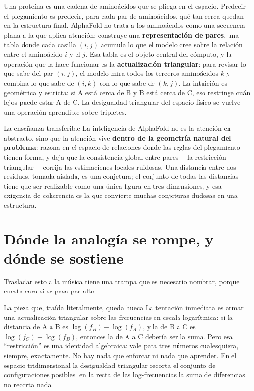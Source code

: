 \documentclass[11pt]{article}
\begin{document}
Una proteína es una cadena de aminoácidos que se pliega en el espacio. Predecir el plegamiento es predecir, para cada par de aminoácidos, qué tan cerca quedan en la estructura final. AlphaFold no trata a los aminoácidos como una secuencia plana a la que aplica atención: construye una \textbf{representación de pares}, una tabla donde cada casilla $(i,j)$ acumula lo que el modelo cree sobre la relación entre el aminoácido $i$ y el $j$. Esa tabla es el objeto central del cómputo, y la operación que la hace funcionar es la \textbf{actualización triangular}: para revisar lo que sabe del par $(i,j)$, el modelo mira todos los terceros aminoácidos $k$ y combina lo que sabe de $(i,k)$ con lo que sabe de $(k,j)$. La intuición es geométrica y estricta: si A está cerca de B y B está cerca de C, eso restringe cuán lejos puede estar A de C. La desigualdad triangular del espacio físico se vuelve una operación aprendible sobre tripletes.

\begin{keybox}{La enseñanza transferible}
La inteligencia de AlphaFold no es la atención en abstracto, sino que la atención vive \textbf{dentro de la geometría natural del problema}: razona en el espacio de relaciones donde las reglas del plegamiento tienen forma, y deja que la consistencia global entre pares —la restricción triangular— corrija las estimaciones locales ruidosas. Una distancia entre dos residuos, tomada aislada, es una conjetura; el conjunto de todas las distancias tiene que ser realizable como una única figura en tres dimensiones, y esa exigencia de coherencia es la que convierte muchas conjeturas dudosas en una estructura.
\end{keybox}

\section{Dónde la analogía se rompe, y dónde se sostiene}

Trasladar esto a la música tiene una trampa que es necesario nombrar, porque cuesta cara si se pasa por alto.

\begin{alertbox}{La pieza que, traída literalmente, queda hueca}
La tentación inmediata es armar una actualización triangular sobre las frecuencias en escala logarítmica: si la distancia de A a B es $\log(f_B) - \log(f_A)$, y la de B a C es $\log(f_C) - \log(f_B)$, entonces la de A a C debería ser la suma. Pero esa ``restricción'' es una identidad algebraica: vale para tres números cualesquiera, siempre, exactamente. No hay nada que enforcar ni nada que aprender. En el espacio tridimensional la desigualdad triangular recorta el conjunto de configuraciones posibles; en la recta de las log-frecuencias la suma de diferencias no recorta nada.
\end{alertbox}
\end{document}
